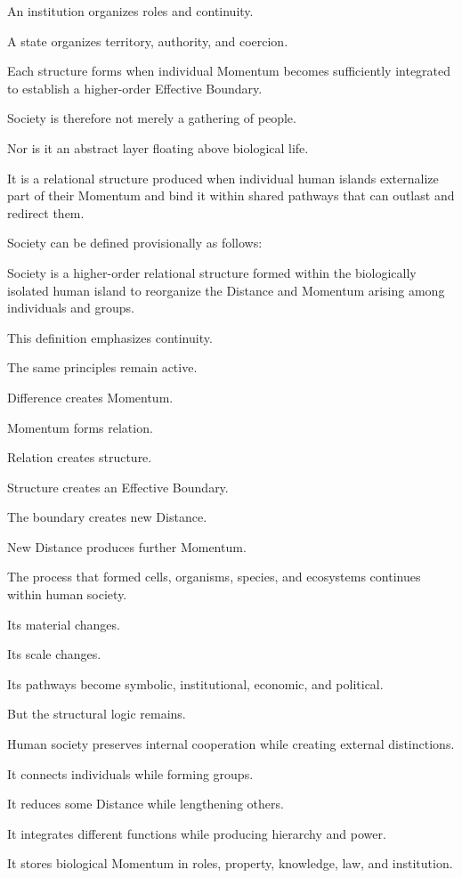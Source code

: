 An institution organizes roles and continuity.

A state organizes territory, authority, and coercion.

Each structure forms when individual Momentum becomes sufficiently integrated to establish a higher-order Effective Boundary.

Society is therefore not merely a gathering of people.

Nor is it an abstract layer floating above biological life.

It is a relational structure produced when individual human islands externalize part of their Momentum and bind it within shared pathways that can outlast and redirect them.

Society can be defined provisionally as follows:

Society is a higher-order relational structure formed within the biologically isolated human island to reorganize the Distance and Momentum arising among individuals and groups.

This definition emphasizes continuity.

The same principles remain active.

Difference creates Momentum.

Momentum forms relation.

Relation creates structure.

Structure creates an Effective Boundary.

The boundary creates new Distance.

New Distance produces further Momentum.

The process that formed cells, organisms, species, and ecosystems continues within human society.

Its material changes.

Its scale changes.

Its pathways become symbolic, institutional, economic, and political.

But the structural logic remains.

Human society preserves internal cooperation while creating external distinctions.

It connects individuals while forming groups.

It reduces some Distance while lengthening others.

It integrates different functions while producing hierarchy and power.

It stores biological Momentum in roles, property, knowledge, law, and institution.

